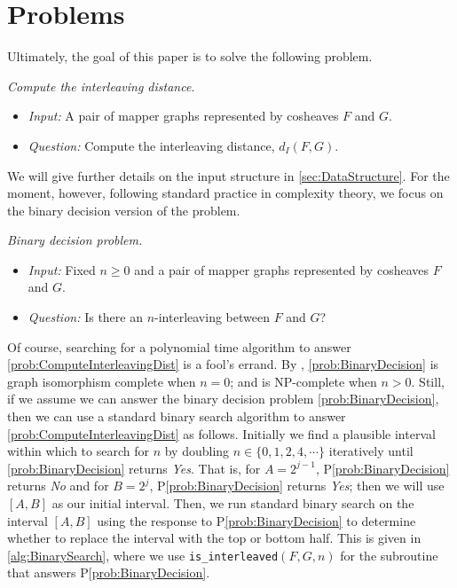 \section{Problems} 
\label{sec:Problems}

Ultimately, the goal of this paper is to solve the following problem. 

\begin{problem}
\label{prob:ComputeInterleavingDist}
\emph{Compute the interleaving distance.}
\begin{itemize}
    \item \emph{Input:}  A pair of mapper graphs represented by cosheaves  $F$ and $G$. 
    \item \emph{Question:} Compute the interleaving distance, $d_I(F,G)$. 
\end{itemize}
\end{problem}

We will give further details on the input structure in \cref{sec:DataStructure}. 
For the moment, however, following standard practice in complexity theory, we focus on the binary decision version of the problem.

\begin{problem} 
\label{prob:BinaryDecision} 
\emph{Binary decision problem.}
\begin{itemize}
    \item \emph{Input:} Fixed $n\geq 0$ and a pair of mapper graphs represented by cosheaves  $F$ and $G$. 
    \item \emph{Question:} Is there an $n$-interleaving between $F$ and $G$? 
\end{itemize}
\end{problem}

Of course, searching for a polynomial time algorithm to answer \cref{prob:ComputeInterleavingDist} is a fool's errand. 
By \cite{bjerkevik2017computational}, \cref{prob:BinaryDecision} is graph isomorphism complete when $n=0$; and is NP-complete when $n >0$. 
Still, if we assume we can answer the binary decision problem \cref{prob:BinaryDecision}, then we can use a standard binary search algorithm to answer \cref{prob:ComputeInterleavingDist} as follows. 
Initially we find a plausible interval  within which to search for $n$ by doubling $n \in \{0, 1, 2, 4,\cdots\}$ iteratively until \cref{prob:BinaryDecision} returns \textit{Yes}.
That is, for $A = 2^{j-1}$, P\ref{prob:BinaryDecision} returns \textit{No} and for $B = 2^j$, P\ref{prob:BinaryDecision} returns \textit{Yes}; then we will use $[A,B]$ as our initial interval.
Then, we run standard binary search on the interval $[A,B]$ using the response to P\ref{prob:BinaryDecision} to determine whether to replace the interval with the top or bottom half. 
This is given in \cref{alg:BinarySearch}, where we use \texttt{is\_interleaved}$(F,G, n)$ for the subroutine that answers P\ref{prob:BinaryDecision}. 

